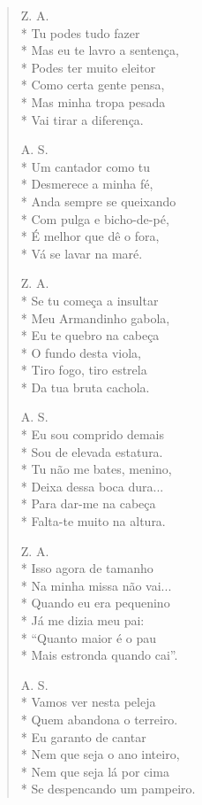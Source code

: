 \begin{verse}
Z. A.\\*
Tu podes tudo fazer\\*
Mas eu te lavro a sentença,\\*
Podes ter muito eleitor\\*
Como certa gente pensa,\\*
Mas minha tropa pesada\\*
Vai tirar a diferença.

A. S.\\*
Um cantador como tu\\*
Desmerece a minha fé,\\*
Anda sempre se queixando\\*
Com pulga e bicho-de-pé,\\*
É melhor que dê o fora,\\*
Vá se lavar na maré.

Z. A.\\*
Se tu começa a insultar\\*
Meu Armandinho gabola,\\*
Eu te quebro na cabeça\\*
O fundo desta viola,\\*
Tiro fogo, tiro estrela\\*
Da tua bruta cachola.

A. S.\\*
Eu sou comprido demais\\*
Sou de elevada estatura.\\*
Tu não me bates, menino,\\*
Deixa dessa boca dura...\\*
Para dar-me na cabeça\\*
Falta-te muito na altura.

Z. A.\\*
Isso agora de tamanho\\*
Na minha missa não vai...\\*
Quando eu era pequenino\\*
Já me dizia meu pai:\\*
“Quanto maior é o pau\\*
Mais estronda quando cai”.

A. S.\\*
Vamos ver nesta peleja\\*
Quem abandona o terreiro.\\*
Eu garanto de cantar\\*
Nem que seja o ano inteiro,\\*
Nem que seja lá por cima\\*
Se despencando um pampeiro.


\end{verse}
